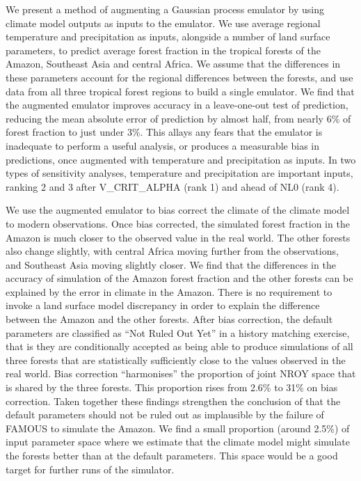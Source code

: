 \documentclass[gmd, manuscript]{copernicus}
\begin{document}
We present a method of augmenting a Gaussian process emulator by using climate model outputs as inputs to the emulator. We use average regional temperature and precipitation as inputs, alongside a number of land surface parameters, to predict average forest fraction in the tropical forests of the Amazon, Southeast Asia and central Africa. We assume that the differences in these parameters account for the regional differences between the forests, and use data from all three tropical forest regions to build a single emulator. We find that the augmented emulator improves accuracy in a leave-one-out test of prediction, reducing the mean absolute error of prediction by almost half, from nearly 6\% of forest fraction to just under 3\%. This allays any fears that the emulator is inadequate to perform a useful analysis, or produces a measurable bias in predictions, once augmented with temperature and precipitation as inputs. In two types of sensitivity analyses, temperature and precipitation are important inputs, ranking 2 and 3 after V\_CRIT\_ALPHA (rank 1) and ahead of NL0 (rank 4).

We use the augmented emulator to bias correct the climate of the climate model to modern observations. Once bias corrected, the simulated forest fraction in the Amazon is much closer to the observed value in the real world. The other forests also change slightly, with central Africa moving further from the observations, and Southeast Asia moving slightly closer. We find that the differences in the accuracy of simulation of the Amazon forest fraction and the other forests can be explained by the error in climate in the Amazon. There is no requirement to invoke a land surface model discrepancy in order to explain the difference between the Amazon and the other forests. After bias correction, the default parameters are classified as ``Not Ruled Out Yet'' in a history matching exercise, that is they are conditionally accepted as being able to produce simulations of all three forests that are statistically sufficiently close to the values observed in the real world. Bias correction ``harmonises'' the proportion of joint NROY space that is shared by the three forests. This proportion rises from 2.6\% to 31\% on bias correction. Taken together these findings strengthen the conclusion of \cite{mcneall2016impact} that the default parameters should not be ruled out as implausible by the failure of FAMOUS to simulate the Amazon. We find a small proportion (around 2.5\%) of input parameter space where we estimate that the climate model might simulate the forests better than at the default parameters. This space would be a good target for further runs of the simulator.
\end{document}
